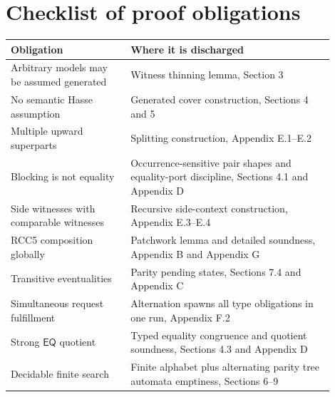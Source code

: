 \documentclass[11pt]{article}
\newcommand{\EQ}{\mathsf{EQ}}
\begin{document}
\section{Checklist of proof obligations}

\begin{longtable}{p{0.33\linewidth}p{0.57\linewidth}}
\toprule
Obligation & Where it is discharged \\
\midrule
Arbitrary models may be assumed generated & Witness thinning lemma, Section 3 \\
No semantic Hasse assumption & Generated cover construction, Sections 4 and 5 \\
Multiple upward superparts & Splitting construction, Appendix E.1--E.2 \\
Blocking is not equality & Occurrence-sensitive pair shapes and equality-port discipline, Sections 4.1 and Appendix D \\
Side witnesses with comparable witnesses & Recursive side-context construction, Appendix E.3--E.4 \\
RCC5 composition globally & Patchwork lemma and detailed soundness, Appendix B and Appendix G \\
Transitive eventualities & Parity pending states, Sections 7.4 and Appendix C \\
Simultaneous request fulfillment & Alternation spawns all type obligations in one run, Appendix F.2 \\
Strong $\EQ$ quotient & Typed equality congruence and quotient soundness, Sections 4.3 and Appendix D \\
Decidable finite search & Finite alphabet plus alternating parity tree automata emptiness, Sections 6--9 \\
\bottomrule
\end{longtable}
\end{document}
